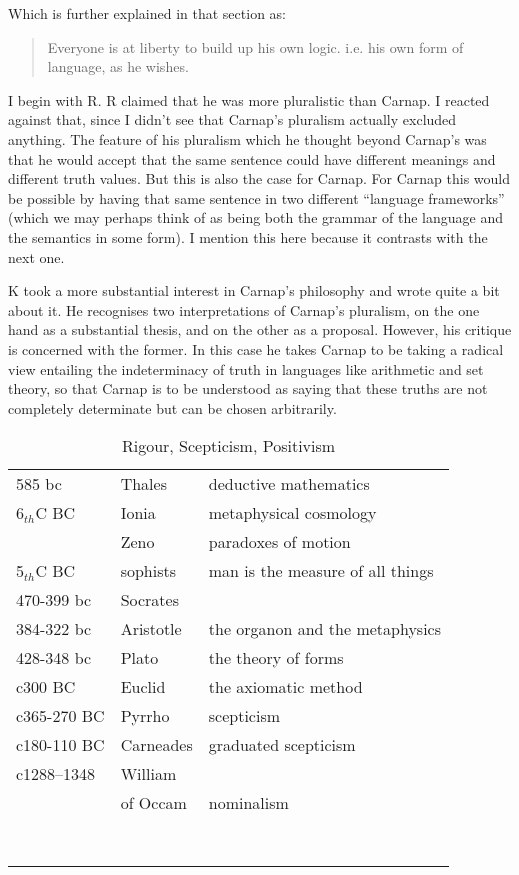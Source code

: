Which is further explained in that section as:
\begin{quote}
Everyone is at liberty to build up his own logic. i.e. his own form of language, as he wishes.
\end{quote}

I begin with R.
R claimed that he was more pluralistic than Carnap.
I reacted against that, since I didn't see that Carnap's pluralism actually excluded anything.
The feature of his pluralism which he thought beyond Carnap's was that he would accept that the same sentence could have different meanings and different truth values.
But this is also the case for Carnap.
For Carnap this would be possible by having that same sentence in two different ``language frameworks'' (which we may perhaps think of as being both the grammar of the language and the semantics in some form).
I mention this here because it contrasts with the next one.

K took a more substantial interest in Carnap's philosophy and wrote quite a bit about it.
He recognises two interpretations of Carnap's pluralism, on the one hand as a substantial thesis, and on the other as a proposal.
However, his critique is concerned with the former.
In this case he takes Carnap to be taking a radical view entailing the indeterminacy of truth in languages like arithmetic and set theory, so that Carnap is to be understood as saying that these truths are not completely determinate but can be chosen arbitrarily.

\begin{table}[h]
\begin{center}
\begin{tabular}{|l l p{5cm}|}
\hline
585 bc & Thales & deductive mathematics \\
6$_{th}$C BC & Ionia & metaphysical cosmology \\
 & Zeno & paradoxes of motion \\
5$_{th}$C BC & sophists & man is the measure of all things \\
470-399 bc & Socrates & \\
384-322 bc & Aristotle & the organon and the metaphysics \\
428-348 bc & Plato & the theory of forms \\

c300 BC & Euclid & the axiomatic method \\
c365-270 BC & Pyrrho & scepticism \\
c180-110 BC & Carneades & graduated scepticism \\
c1288–1348 & William & \\
& of Occam & nominalism \\
 &  & \\
 &  & \\
 &  & \\
 &  & \\
 &  & \\
 &  & \\
 &  & \\
 &  & \\
\hline
\end{tabular}
\caption{Rigour, Scepticism, Positivism}
\label{tab:RigourScepticismPositivism}
\end{center}
\end{table}
